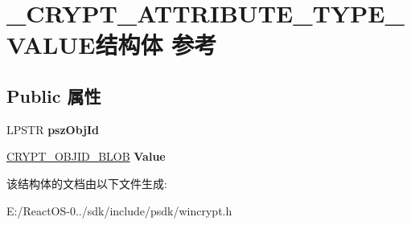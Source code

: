 \hypertarget{struct___c_r_y_p_t___a_t_t_r_i_b_u_t_e___t_y_p_e___v_a_l_u_e}{}\section{\+\_\+\+C\+R\+Y\+P\+T\+\_\+\+A\+T\+T\+R\+I\+B\+U\+T\+E\+\_\+\+T\+Y\+P\+E\+\_\+\+V\+A\+L\+U\+E结构体 参考}
\label{struct___c_r_y_p_t___a_t_t_r_i_b_u_t_e___t_y_p_e___v_a_l_u_e}
\subsection*{Public 属性}
\begin{DoxyCompactItemize}
\item 
\mbox{\label{struct___c_r_y_p_t___a_t_t_r_i_b_u_t_e___t_y_p_e___v_a_l_u_e_a1142b47263980d5e9f7af0039ac7a634}} 
L\+P\+S\+TR {\bfseries psz\+Obj\+Id}
\item 
\mbox{\label{struct___c_r_y_p_t___a_t_t_r_i_b_u_t_e___t_y_p_e___v_a_l_u_e_ae0f905c474216d364de1ca630b004d15}} 
\hyperlink{struct___c_r_y_p_t_o_a_p_i___b_l_o_b}{C\+R\+Y\+P\+T\+\_\+\+O\+B\+J\+I\+D\+\_\+\+B\+L\+OB} {\bfseries Value}
\end{DoxyCompactItemize}


该结构体的文档由以下文件生成\+:\begin{DoxyCompactItemize}
\item 
E\+:/\+React\+O\+S-\/0../sdk/include/psdk/wincrypt.\+h\end{DoxyCompactItemize}
